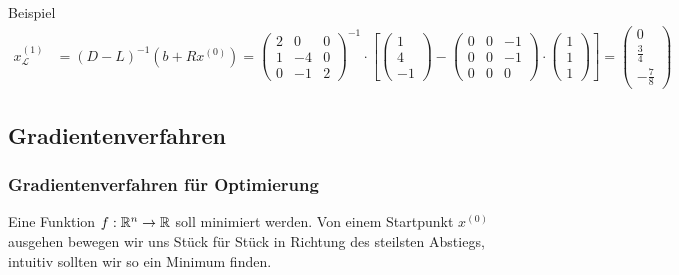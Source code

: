 \begin{colbox}{Beispiel}
\begin{align*}
    x_\mathcal{L}^{(1)} 
    &= (D-L)^{-1}(b+Rx^{(0)}) 
    = \begin{pmatrix}
      2 & 0 & 0 \\ 1 & -4 & 0 \\ 0 & -1 & 2
    \end{pmatrix}^{-1} \cdot \left[\begin{pmatrix}
      1 \\ 4 \\ -1
    \end{pmatrix}-\begin{pmatrix}
      0 & 0 & -1 \\ 0 & 0 & -1 \\ 0 & 0 & 0
    \end{pmatrix}\cdot\begin{pmatrix}
      1 \\ 1 \\ 1
    \end{pmatrix}\right]
    =  \begin{pmatrix}
      0 \\ \tfrac{3}{4} \\ -\tfrac{7}{8}
    \end{pmatrix}
  \end{align*}
\end{colbox}

\subsection{Gradientenverfahren}

\subsubsection{Gradientenverfahren für Optimierung} 
Eine Funktion $f:\mathbb R^n\rightarrow \mathbb R$ soll minimiert werden.
Von einem Startpunkt $x^{(0)}$ ausgehen bewegen wir uns Stück für Stück in Richtung des steilsten Abstiegs, 
intuitiv sollten wir so ein Minimum finden. 

